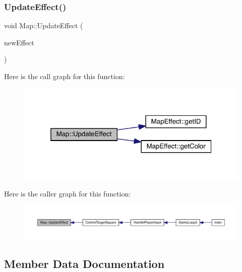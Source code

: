 \mbox{\label{class_map_a7ba59d3c72accc7e8af4624f8e0abe69}} 
\subsubsection{\texorpdfstring{Update\+Effect()}{UpdateEffect()}}
{\footnotesize\ttfamily void Map\+::\+Update\+Effect (\begin{DoxyParamCaption}\item[{\mbox{\hyperlink{class_map_effect}{Map\+Effect}}}]{new\+Effect }\end{DoxyParamCaption})}

Here is the call graph for this function\+:
\nopagebreak
\begin{figure}[H]
\begin{center}
\leavevmode
\includegraphics[width=319pt]{dd/d11/class_map_a7ba59d3c72accc7e8af4624f8e0abe69_cgraph}
\end{center}
\end{figure}
Here is the caller graph for this function\+:
\nopagebreak
\begin{figure}[H]
\begin{center}
\leavevmode
\includegraphics[width=350pt]{dd/d11/class_map_a7ba59d3c72accc7e8af4624f8e0abe69_icgraph}
\end{center}
\end{figure}


\subsection{Member Data Documentation}
\mbox{\label{class_map_adba7c06f06362ce22f16be96a723dcaf}} 

